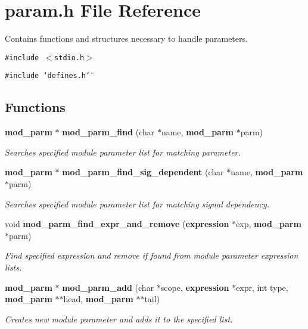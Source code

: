 \section{param.h File Reference}
\label{param_8h}
Contains functions and structures necessary to handle parameters. 


{\tt \#include $<$stdio.h$>$}\par
{\tt \#include \char`\"{}defines.h\char`\"{}}\par
\subsection*{Functions}
\begin{CompactItemize}
\item 
{\bf mod\_\-parm} $\ast$ {\bf mod\_\-parm\_\-find} (char $\ast$name, {\bf mod\_\-parm} $\ast$parm)
\begin{CompactList}\small\item\em Searches specified module parameter list for matching parameter.\item\end{CompactList}\item 
{\bf mod\_\-parm} $\ast$ {\bf mod\_\-parm\_\-find\_\-sig\_\-dependent} (char $\ast$name, {\bf mod\_\-parm} $\ast$parm)
\begin{CompactList}\small\item\em Searches specified module parameter list for matching signal dependency.\item\end{CompactList}\item 
void {\bf mod\_\-parm\_\-find\_\-expr\_\-and\_\-remove} ({\bf expression} $\ast$exp, {\bf mod\_\-parm} $\ast$parm)
\begin{CompactList}\small\item\em Find specified expression and remove if found from module parameter expression lists.\item\end{CompactList}\item 
{\bf mod\_\-parm} $\ast$ {\bf mod\_\-parm\_\-add} (char $\ast$scope, {\bf expression} $\ast$expr, int type, {\bf mod\_\-parm} $\ast$$\ast$head, {\bf mod\_\-parm} $\ast$$\ast$tail)
\begin{CompactList}\small\item\em Creates new module parameter and adds it to the specified list.\item\end{CompactList}\item 

\end{CompactItemize}
